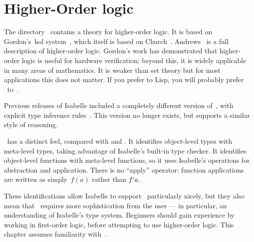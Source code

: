 \chapter{Higher-Order logic}
The directory~ contains a theory for higher-order logic.
It is based on Gordon's~{\sc hol} system~\cite{mgordon88a}, which itself is
based on Church~\cite{church40}.  Andrews~\cite{andrews86} is a full
description of higher-order logic.  Gordon's work has demonstrated that
higher-order logic is useful for hardware verification; beyond this, it is
widely applicable in many areas of mathematics.  It is weaker than {\ZF}
set theory but for most applications this does not matter.  If you prefer
{\ML} to Lisp, you will probably prefer \HOL\ to~{\ZF}.

Previous releases of Isabelle included a completely different version
of~\HOL, with explicit type inference rules~\cite{paulson-COLOG}.  This
version no longer exists, but  supports a similar style of
reasoning.

\HOL\ has a distinct feel, compared with {\ZF} and {\CTT}.  It
identifies object-level types with meta-level types, taking advantage of
Isabelle's built-in type checker.  It identifies object-level functions
with meta-level functions, so it uses Isabelle's operations for abstraction
and application.  There is no ``apply'' operator: function applications are
written as simply~$f(a)$ rather than $f{\tt`}a$.

These identifications allow Isabelle to support \HOL\ particularly nicely,
but they also mean that \HOL\ requires more sophistication from the user
--- in particular, an understanding of Isabelle's type system.  Beginners
should gain experience by working in first-order logic, before attempting
to use higher-order logic.  This chapter assumes familiarity with~{\FOL{}}.


